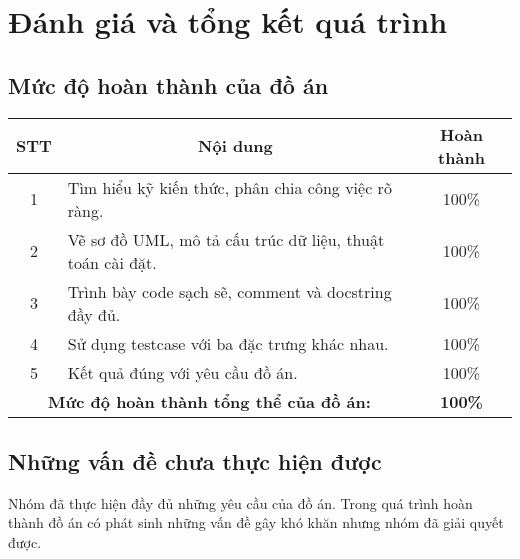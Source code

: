 \section{Đánh giá và tổng kết quá trình}

\subsection{Mức độ hoàn thành của đồ án}

\begin{table}[H]\centering{}
\begin{tabular}{@{}clc@{}}
\toprule
\textbf{STT} & \multicolumn{1}{c}{\textbf{Nội dung}} & \textbf{Hoàn thành} \\ \midrule
1 & Tìm hiểu kỹ kiến thức, phân chia công việc rõ ràng. & 100\% \\
2 & Vẽ sơ đồ UML, mô tả cấu trúc dữ liệu, thuật toán cài đặt. & 100\% \\
3 & Trình bày code sạch sẽ, comment và docstring đầy đủ. & 100\% \\
4 & Sử dụng testcase với ba đặc trưng khác nhau. & 100\% \\
5 & Kết quả đúng với yêu cầu đồ án. & 100\% \\ \midrule
\multicolumn{2}{c}{\textbf{Mức độ hoàn thành tổng thể của đồ án:}} & \textbf{100\%} \\ \bottomrule
\end{tabular}
\end{table}

\subsection{Những vấn đề chưa thực hiện được}
Nhóm đã thực hiện đầy đủ những yêu cầu của đồ án. Trong quá trình hoàn thành đồ án có phát sinh những vấn đề gây khó khăn nhưng nhóm đã giải quyết được.

\newpage